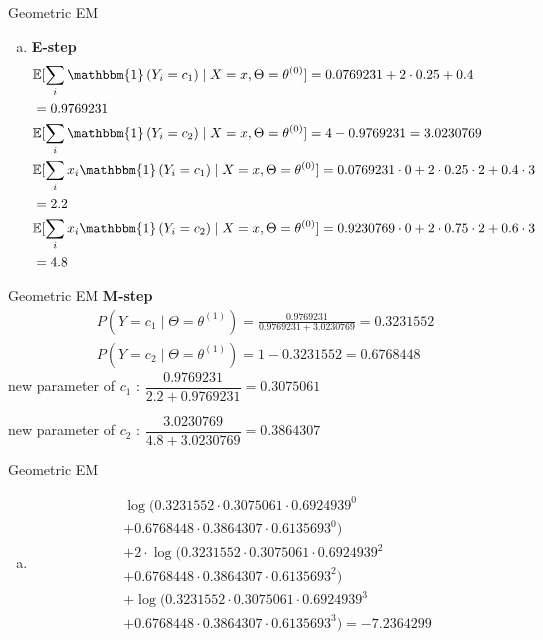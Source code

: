 \documentclass{beamer}\usepackage[]{graphicx}\usepackage[]{color}
\newcommand{\id}[1]{\mathbbm{1}\left(#1\right)}
\begin{document}
\begin{frame}{Geometric EM}
\small
\begin{enumerate}[c)]
\item \textbf{E-step}\begin{align*}
&\mathbb{E}[\sum_{i}\id{Y_{i}=c_{1}}\mid X=x, \Theta=\theta^{(0)}] = 0.0769231 + 
2\cdot 0.25 + 0.4 \\
&= 0.9769231 \\
&\mathbb{E}[\sum_{i}\id{Y_{i}=c_{2}}\mid X=x, \Theta=\theta^{(0)}] = 4 - 0.9769231 = 3.0230769 \\
&\mathbb{E}[\sum_{i}x_{i}\id{Y_{i}=c_{1}}\mid X=x, \Theta=\theta^{(0)}] = 0.0769231 \cdot 0 + 
2\cdot 0.25 \cdot 2 + 0.4 \cdot 3\\
&= 2.2 \\
&\mathbb{E}[\sum_{i}x_{i}\id{Y_{i}=c_{2}}\mid X=x, \Theta=\theta^{(0)}] = 0.9230769 \cdot 0 + 
2\cdot 0.75 \cdot 2 + 0.6 \cdot 3\\
&= 4.8
\end{align*}
\end{enumerate}
\end{frame}



\begin{frame}{Geometric EM}
\textbf{M-step}
\begin{align*}
&P(Y=c_{1}\mid \Theta = \theta^{(1)}) = \frac{0.9769231}{0.9769231 + 3.0230769} = 0.3231552 \\
&P(Y=c_{2}\mid \Theta = \theta^{(1)}) = 1 - 0.3231552
= 0.6768448 
\end{align*}
new parameter of $ c_{1} $ : $ \dfrac{0.9769231}{2.2 + 0.9769231} = 0.3075061 $\vspace{.5cm}

new parameter of $ c_{2} $ : $ \dfrac{3.0230769}{4.8 + 3.0230769} = 0.3864307 $
\end{frame}

\begin{frame}{Geometric EM}
\begin{enumerate}[d)]
\item \begin{align*}
&\log(0.3231552\cdot 0.3075061\cdot 0.6924939^{0}  \\
&+ 0.6768448 \cdot 0.3864307 \cdot 0.6135693^{0}) \\
&+ 2\cdot \log(0.3231552\cdot 0.3075061 \cdot 0.6924939^{2} \\
&+ 0.6768448\cdot 0.3864307 \cdot 0.6135693^{2}) \\
&+ \log(0.3231552\cdot 0.3075061 \cdot 0.6924939^{3} \\
&+ 0.6768448\cdot 0.3864307 \cdot 0.6135693^{3})
= \ensuremath{-7.2364299} 
\end{align*}
\end{enumerate}
\end{frame}
\end{document}
